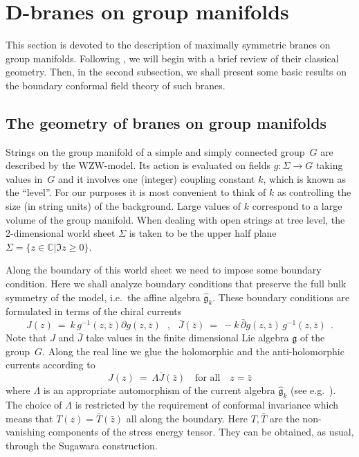 \documentclass[12pt,a4paper]{article}
\newcommand{\mf}{\mathfrak} %
\def\QC{\mathbb{C}}
\def\asg{{\hat{\mf{g}}}}
\def\bz{{\bar z}}
\def\pl{\partial}
\def\bJ{{\bar J}}
\def\bpl{\bar \partial}
\def\bT{{\bar T}}
\begin{document}
\section{D-branes on group manifolds}

This section is devoted to the description of maximally 
symmetric branes on group manifolds. Following \cite{Alekseev:1998mc,
Felder:1999ka}, we will begin with a brief review of their classical 
geometry. Then, in the second subsection, we shall present 
some basic results on the boundary conformal field theory 
of such branes.    

\subsection{The geometry of branes on group manifolds}

Strings on the group manifold of a simple and simply connected 
group~$G$ are described by the WZW-model. Its action is evaluated on 
fields $g: \Sigma \to G$ taking values in~$G$ and it involves 
one (integer) coupling constant $k$, which is known as the ``level''. 
For our purposes it is most convenient to think of $k$ as controlling 
the size (in string units) of the background. Large values of $k$ 
correspond to a large volume of the group manifold. When dealing 
with open strings at tree level, the 2-dimensional world sheet 
$\Sigma$ is taken to be the upper half plane $\Sigma = \{ z \in 
\QC | \Im z \geq 0\}$. 
\smallskip

Along the boundary of this world sheet we need to impose some 
boundary condition. Here we shall analyze boundary conditions 
that preserve the full bulk symmetry of the model, i.e.\ the 
affine algebra $\asg_k$. These boundary conditions are formulated 
in terms of the chiral currents 
\begin{equation}
 J (z) \ = \ k \, g^{-1}(z,\bz) \pl g(z,\bz ) \ \ \  , \ \ \ 
   \bJ (\bz) \ = \ -k \, \bpl g(z,\bz ) \, g^{-1}(z,\bz)\ \ .
\end{equation}
Note that $J$ and $\bJ$ take values in the finite dimensional 
Lie algebra $\mf{g}$ of the group~$G$. Along the real line we glue 
the holomorphic and the anti-holomorphic currents  according to 
\begin{equation}
  \label{glue}  
  J(z) \ = \ \Lambda \bJ(\bz)  \ \ \ 
  \text{ for all } \ \ \ z = \bz 
\end{equation}
where $\Lambda$ is an appropriate automorphism of the current  
algebra $\asg_k$ (see e.g.\ \cite{Recknagel:1998sb}). The choice of 
$\Lambda$ is restricted by the requirement of conformal 
invariance which means that $T(z) = \bT(\bz)$ all along the 
boundary. Here $T, \bT$ are the non-vanishing components
of the stress energy tensor. They can be obtained, as usual,
through the Sugawara construction.
\smallskip
\end{document}
